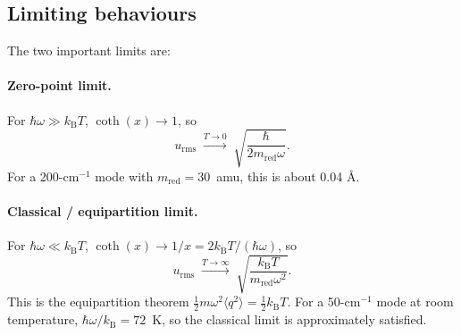 \documentclass[10pt,a4paper,twoside]{article}
\newcommand{\kB}{k_{\mathrm{B}}}
\newcommand{\urms}{u_{\mathrm{rms}}}
\begin{document}
\subsection{Limiting behaviours}

The two important limits are:

\paragraph{Zero-point limit.}
For $\hbar\omega \gg \kB T$, $\coth(x) \to 1$, so
\begin{equation}
  \urms \;\xrightarrow{T \to 0}\; \sqrt{\frac{\hbar}{2 m_\text{red}\omega}}.
  \label{eq:urms-zeropoint}
\end{equation}
For a 200-cm$^{-1}$ mode with $m_\text{red} = 30$~amu, this is
about 0.04 \AA{}.

\paragraph{Classical / equipartition limit.}
For $\hbar\omega \ll \kB T$, $\coth(x) \to 1/x = 2\kB T/(\hbar\omega)$,
so
\begin{equation}
  \urms \;\xrightarrow{T \to \infty}\;
    \sqrt{\frac{\kB T}{m_\text{red}\omega^2}}.
  \label{eq:urms-classical}
\end{equation}
This is the equipartition theorem
$\tfrac{1}{2}m\omega^2 \langle q^2 \rangle = \tfrac{1}{2}\kB T$.
For a 50-cm$^{-1}$ mode at room temperature, $\hbar\omega/\kB =
72$~K, so the classical limit is approximately satisfied.
\end{document}
